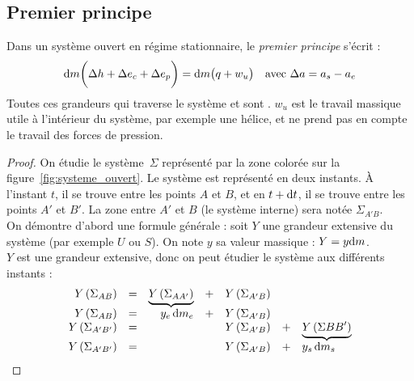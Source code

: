 \documentclass[11pt,a4paper,fleqn,pdftex]{report}
\begin{document}
\subsection{Premier principe}
\begin{itheorem}
   Dans un système ouvert en régime stationnaire, le \emph{premier principe} s'écrit : 
   \begin{equation}
   \mathrm{d} m \bigg( \Delta h + \Delta e_c +\Delta e_p \bigg) = \mathrm{d} m \big( q + w_u \big)\\ \quad\text{avec }\Delta a = a_s - a_e
   \end{equation}
   Toutes ces grandeurs  qui traverse le système et sont . $w_u$ est le travail massique utile à l'intérieur du système, par exemple une hélice, et ne prend pas en compte le travail des forces de pression.\\ %
\end{itheorem}
\begin{proof}
   On étudie le système~$\Sigma$ représenté par la zone \textcolor{couleurClaire}{colorée} sur la figure~\ref{fig:systeme_ouvert}. Le système est représenté en deux instants. À l'instant $t$, il se trouve entre les points $A$ et $B$, et en $t+\mathrm{d} t$, il se trouve entre les points $A'$ et $B'$. La zone entre $A'$ et $B$ (le système interne) sera notée $\Sigma_{A'B}$.\\
   On démontre d'abord une formule générale : soit $Y$ une grandeur extensive du système (par exemple $U$ ou $S$). On note $y$ sa valeur massique : $Y = y\mathrm{d} m$. \\
   $Y$ est une grandeur extensive, donc on peut étudier le système aux différents instants :
   \[
   \begin{array}{r c r c c c l}
   Y\left( \Sigma_{AB}\right) &=& \underbrace{Y \left( \Sigma_{AA'} \right)}  &+& Y\left( \Sigma_{A'B}\right)& \\
   Y\left( \Sigma_{AB}\right) &=& y_e\, \mathrm{d} m_e &+& Y\left( \Sigma_{A'B}\right)& \\
   Y\left( \Sigma_{A'B'}\right) &=& &&Y\left( \Sigma_{A'B}\right) &+& \underbrace{Y \left( \Sigma{BB'} \right) } \\
   Y\left( \Sigma_{A'B'}\right) &=& &&Y\left( \Sigma_{A'B}\right) &+& y_s\, \mathrm{d} m_s
   \end{array}
   \]
\end{proof}
\end{document}
